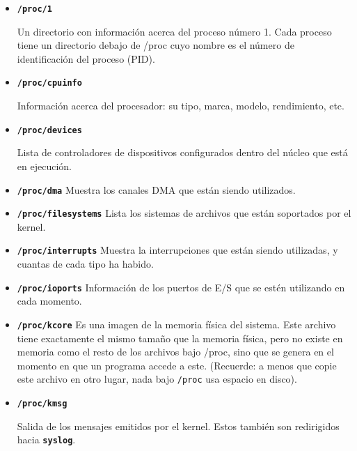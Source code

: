 	\begin{itemize} 
	
	\item

	\textbf{\texttt{/proc/1}}

	 Un directorio con información acerca del proceso número
	1. 	Cada proceso tiene un directorio debajo de /proc cuyo nombre es
	el número de identificación del proceso (PID).  
	
	
	\item
	
	\textbf{\texttt{/proc/cpuinfo}}
	
	 Información acerca del procesador: su tipo, marca,
	modelo, 	rendimiento, etc.  
	
	
	\item
	
	\textbf{\texttt{/proc/devices}}
	
	 Lista de controladores de dispositivos configurados
	dentro 	del núcleo que está en ejecución.
	
	
	\item \textbf{\texttt{/proc/dma}}
	 Muestra los canales DMA que están siendo utilizados.
	
	
	\item
	\textbf{\texttt{/proc/filesystems}}
	 Lista los sistemas de archivos que están soportados por
	el kernel.  
	
	\item
	\textbf{\texttt{/proc/interrupts}}
	 Muestra la interrupciones que están siendo utilizadas, y
	cuantas de cada tipo ha habido.  
	
	\item \textbf{\texttt{/proc/ioports}}
	 Información de los puertos de E/S que se estén
	utilizando 	en cada momento.  
	
	\item \textbf{\texttt{/proc/kcore}}
	 Es una imagen de la memoria física del sistema. Este
	archivo tiene exactamente el mismo tamaño que la memoria física, pero no
	existe en memoria como el resto de los archivos bajo /proc, sino que se
	genera en el momento en que un programa accede a este. (Recuerde: a
	menos que copie este archivo en otro lugar, nada bajo
	\texttt{/proc} usa espacio en disco).
	
	
	\item
	
	\textbf{\texttt{/proc/kmsg}}
	
	 Salida de los mensajes emitidos por el kernel. Estos
	también son redirigidos hacia \texttt{\textbf{syslog}}.
		

\end{itemize}
